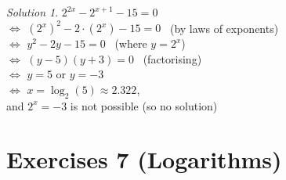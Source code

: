 \documentclass[
  english,
  12pt,
  oneside]{book}
\theoremstyle{definition}
\theoremstyle{definition}
\theoremstyle{definition}
\theoremstyle{definition}
\theoremstyle{remark}
\newtheorem*{solution}{Solution}
\begin{document}
\begin{solution}
\(2^{2x}-2^{x+1}-15=0\)\\
\(\iff\) \(\left(2^x\right)^2-2\cdot\left(2^x\right)-15=0\) \hfill~{(by laws of exponents)}\\
\(\iff\) \(y^2 -2y-15=0\) \hfill~{(where \(y=2^x\))}\\
\(\iff\) \((y-5)(y+3)=0\) \hfill~{(factorising)}\\
\(\iff\) \(y=5\) or \(y=-3\)\\
\(\iff\) \(x=\log_2(5)\approx 2.322\),\\
and \(2^x=-3\) is not possible (so no solution)
\end{solution}

\chapter*{Exercises 7 (Logarithms)}\label{exercises-7-logarithms}
\end{document}
